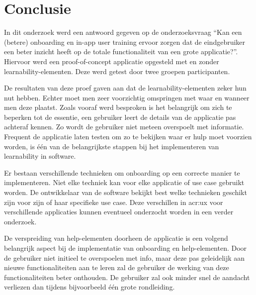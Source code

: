 
\chapter{Conclusie}
\label{ch:conclusie}


In dit onderzoek werd een antwoord gegeven op de onderzoeksvraag ``Kan een (betere) onboarding en in-app user training ervoor zorgen dat de eindgebruiker een beter inzicht heeft op de totale functionaliteit van een grote applicatie?''. Hiervoor werd een proof-of-concept applicatie opgesteld met en zonder learnability-elementen. Deze werd getest door twee groepen participanten.

De resultaten van deze proef gaven aan dat de learnability-elementen zeker hun nut hebben. Echter moet men zeer voorzichtig omspringen met waar en wanneer men deze plaatst. Zoals vooraf werd besproken is het belangrijk om zich te beperken tot de essentie, een gebruiker leert de details van de applicatie pas achteraf kennen. Zo wordt de gebruiker niet meteen overspoelt met informatie. Frequent de applicatie laten testen om zo te bekijken waar er hulp moet voorzien worden, is één van de belangrijkste stappen bij het implementeren van learnability in software.

Er bestaan verschillende technieken om onboarding op een correcte manier te implementeren. Niet elke techniek kan voor elke applicatie of use case gebruikt worden. De ontwikkelaar van de software bekijkt best welke technieken geschikt zijn voor zijn of haar specifieke use case. Deze verschillen in \acrshort{acr:ux} voor verschillende applicaties kunnen eventueel onderzocht worden in een verder onderzoek.

De verspreiding van help-elementen doorheen de applicatie is een volgend belangrijk aspect bij de implementatie van onboarding en help-elementen. Door de gebruiker niet initieel te overspoelen met info, maar deze pas geleidelijk aan nieuwe functionaliteiten aan te leren zal de gebruiker de werking van deze functionaliteiten beter onthouden. De gebruiker zal ook minder snel de aandacht verliezen dan tijdens bijvoorbeeld één grote rondleiding.

